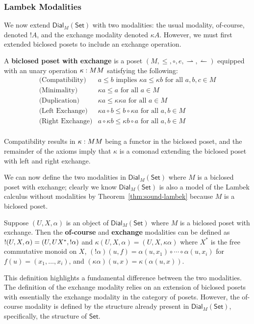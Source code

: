 \documentclass{lmcs}
\let\to\relax                   %
\newcommand{\to}{\rightarrow}
\newcommand{\rto}{\leftharpoonup}
\newcommand{\lto}{\rightharpoonup}
\newcommand{\Set}{\mathsf{Set}}
\newcommand{\Dial}[2]{\mathsf{Dial}_{#1}(#2)}
\begin{document}
\subsubsection{Lambek Modalities}
\label{subsec:modalities}
We now extend $\Dial{M}{\Set}$ with two modalities: the usual
modality, of-course, denoted $!A$, and the exchange modality denoted
$\kappa A$.  However, we must first extended biclosed posets to
include an exchange operation.

\begin{defi}
  \label{def:biclosed-exchange}
  A \textbf{biclosed poset with exchange} is a poset $(M, \leq, \circ,
  e, \lto, \rto)$ equipped with an unary operation $\kappa : M \to M$
  satisfying the following:
  \[
  \begin{array}{clr}
    \text{(Compatibility)} & a \leq b \text{ implies } \kappa a \leq \kappa b \text{ for all } a,b,c \in M\\
    \text{(Minimality)} & \kappa a \leq a \text{ for all } a \in M\\
    \text{(Duplication)} & \kappa a \leq \kappa\kappa a \text{ for all } a \in M\\
    \text{(Left Exchange)} & \kappa a \circ b \leq b \circ \kappa a \text{ for all } a, b \in M\\
    \text{(Right Exchange)} & a \circ \kappa b \leq \kappa b \circ a \text{ for all } a, b \in M\\
  \end{array}
  \]
\end{defi}
\noindent
Compatibility results in $\kappa : M \to M$ being a functor in the
biclosed poset, and the remainder of the axioms imply that $\kappa$ is
a comonad extending the biclosed poset with left and right exchange.

We can now define the two modalities in $\Dial{M}{\Set}$ where $M$ is
a biclosed poset with exchange; clearly we know $\Dial{M}{\Set}$ is
also a model of the Lambek calculus without modalities by
Theorem~\ref{thm:sound-lambek} because $M$ is a biclosed poset.
\begin{defi}
  \label{def:modalities-dial}
  Suppose $(U, X, \alpha)$ is an object of $\Dial{M}{\Set}$ where $M$
  is a biclosed poset with exchange. Then the \textbf{of-course} and
  \textbf{exchange} modalities can be defined as 
  $! (U, X, \alpha) = (U, U \to X^*, !\alpha)$ and
  $\kappa (U, X, \alpha) = (U, X, \kappa \alpha)$
  where $X^*$ is the free commutative monoid on $X$, $(!\alpha)(u, f)
  = \alpha(u, x_1) \circ \cdots \circ \alpha(u, x_i)$ for $f(u) =
  (x_1, \ldots, x_i)$, and $(\kappa \alpha)(u, x) = \kappa (\alpha(u,
  x))$.
\end{defi}
This definition highlights a fundamental difference between the two
modalities.  The definition of the exchange modality relies on an
extension of biclosed posets with essentially the exchange modality in
the category of posets.  However, the of-course modality is defined by
the structure already present in $\Dial{M}{\Set}$, specifically, the
structure of $\Set$.
\end{document}
